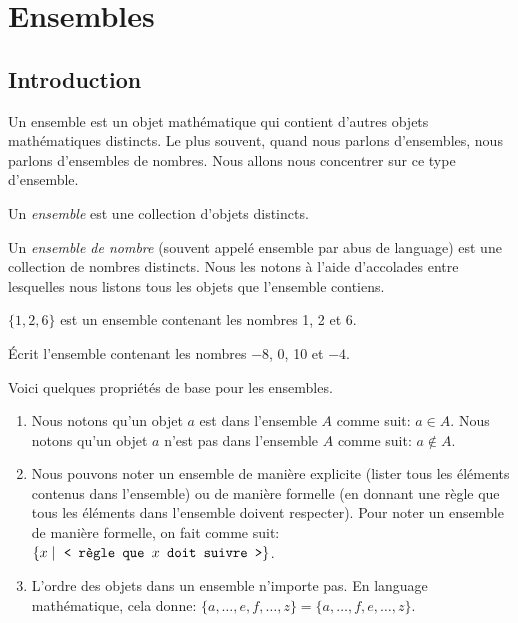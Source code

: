 \chapter{Ensembles}

\section{Introduction}

Un ensemble est un objet mathématique qui contient d'autres objets mathématiques distincts. Le plus souvent, quand nous parlons d'ensembles, nous parlons d'ensembles de nombres. Nous allons nous concentrer sur ce type d'ensemble.

\begin{definition}
    Un \emph{ensemble} est une collection d'objets distincts.
\end{definition}

\begin{definition}
    Un \emph{ensemble de nombre} (souvent appelé ensemble par abus de language) est une collection de nombres distincts. Nous les notons à l'aide d'accolades entre lesquelles nous listons tous les objets que l'ensemble contiens.
\end{definition}
\begin{exemple}
    $\{1, 2, 6\}$ est un ensemble contenant les nombres 1, 2 et 6.
\end{exemple}
\begin{exercice}
    Écrit l'ensemble contenant les nombres $-8$, 0, 10 et $-4$.
\end{exercice}

\begin{propriete}
    Voici quelques propriétés de base pour les ensembles.
    \begin{enumerate}
        \item Nous notons qu'un objet $a$ est dans l'ensemble $A$ comme suit: $a\in A$. Nous notons qu'un objet $a$ n'est pas dans l'ensemble $A$ comme suit: $a\not\in A$.
        \item Nous pouvons noter un ensemble de manière explicite (lister tous les éléments contenus dans l'ensemble) ou de manière formelle (en donnant une règle que tous les éléments dans l'ensemble doivent respecter). Pour noter un ensemble de manière formelle, on fait comme suit: $\{x \mid~\text{\ttfamily <~règle que $x$ doit suivre~>}\}$.
        \item L'ordre des objets dans un ensemble n'importe pas. En language mathématique, cela donne: $\{a, \dots, e, f, \dots, z\} = \{a, \dots, f, e, \dots, z\}$.
    \end{enumerate}
\end{propriete}

